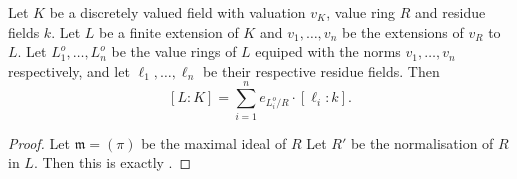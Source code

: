 \begin{proposition}\label{prop:balancing_valuations}
	Let $K$ be a discretely valued field with valuation $v_K$,  value ring $R$ and residue fields $k$. 
	Let $L$ be a finite extension of $K$ and $v_1, \ldots, v_n$ be the extensions of $v_R$ to $L$. 
	Let $L_1^{o}, \ldots, L_n^{o}$ be the value rings of $L$ equiped with the norms $v_1, \ldots, v_n$ respectively, and let $\ell_1, \ldots, \ell_n$ be their respective residue fields. 
	Then \[
		[L: K] = \sum_{i= 1}^{n} e_{L_i^{o} / R} \cdot [\ell_i: k]
	.\] 
\end{proposition}
\begin{proof}
	Let $\mathfrak{m} = (\pi) $ be the maximal ideal of $R$
	Let $R'$ be the normalisation of $R$ in $L$. 
	Then this is exactly .
\end{proof}




 
